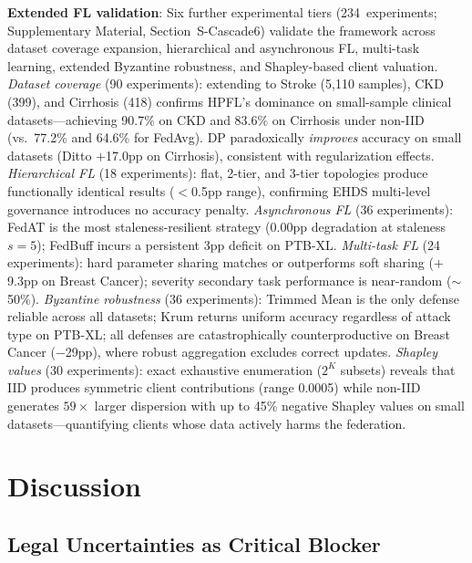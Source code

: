 \documentclass[conference,a4paper]{IEEEtran}
\begin{document}
\textbf{Extended FL validation}: Six further experimental tiers (234~experiments; Supplementary Material, Section~S-Cascade6) validate the framework across dataset coverage expansion, hierarchical and asynchronous FL, multi-task learning, extended Byzantine robustness, and Shapley-based client valuation. \textit{Dataset coverage} (90 experiments): extending to Stroke (5,110 samples), CKD (399), and Cirrhosis (418) confirms HPFL's dominance on small-sample clinical datasets---achieving 90.7\% on CKD and 83.6\% on Cirrhosis under non-IID (vs.\ 77.2\% and 64.6\% for FedAvg). DP paradoxically \textit{improves} accuracy on small datasets (Ditto $+$17.0pp on Cirrhosis), consistent with regularization effects. \textit{Hierarchical FL} (18 experiments): flat, 2-tier, and 3-tier topologies produce functionally identical results ($<$0.5pp range), confirming EHDS multi-level governance introduces no accuracy penalty. \textit{Asynchronous FL} (36 experiments): FedAT is the most staleness-resilient strategy (0.00pp degradation at staleness $s{=}5$); FedBuff incurs a persistent 3pp deficit on PTB-XL. \textit{Multi-task FL} (24 experiments): hard parameter sharing matches or outperforms soft sharing ($+$9.3pp on Breast Cancer); severity secondary task performance is near-random ($\sim$50\%). \textit{Byzantine robustness} (36 experiments): Trimmed Mean is the only defense reliable across all datasets; Krum returns uniform accuracy regardless of attack type on PTB-XL; all defenses are catastrophically counterproductive on Breast Cancer ($-$29pp), where robust aggregation excludes correct updates. \textit{Shapley values} (30 experiments): exact exhaustive enumeration ($2^K$ subsets) reveals that IID produces symmetric client contributions (range 0.0005) while non-IID generates $59\times$ larger dispersion with up to 45\% negative Shapley values on small datasets---quantifying clients whose data actively harms the federation.

\section{Discussion}
\label{sec:discussion}

\subsection{Legal Uncertainties as Critical Blocker}
\end{document}
